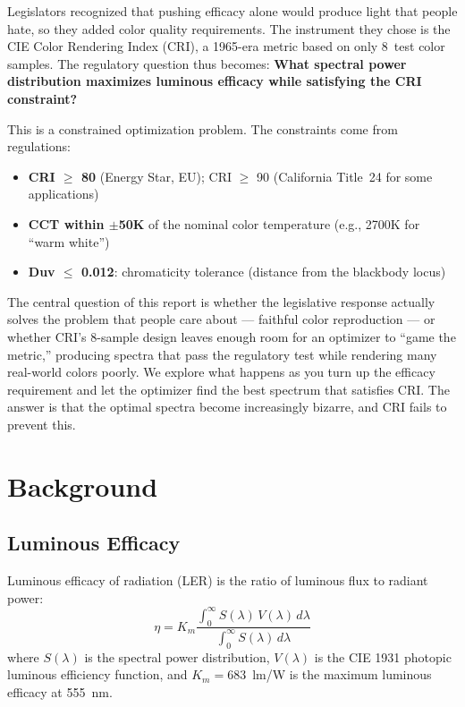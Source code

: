 \documentclass[11pt]{article}
\begin{document}
Legislators recognized that pushing efficacy alone would produce light that
people hate, so they added color quality requirements.  The instrument they
chose is the CIE Color Rendering Index (CRI), a 1965-era metric based on
only 8~test color samples.  The regulatory question thus becomes:
\textbf{What spectral power distribution maximizes luminous efficacy while
satisfying the CRI constraint?}

This is a constrained optimization problem.  The constraints come from
regulations:
\begin{itemize}
\item \textbf{CRI $\geq$ 80} (Energy Star, EU); CRI $\geq$ 90 (California Title~24 for some applications)
\item \textbf{CCT within $\pm$50K} of the nominal color temperature (e.g., 2700K for ``warm white'')
\item \textbf{Duv $\leq$ 0.012}: chromaticity tolerance (distance from the blackbody locus)
\end{itemize}

The central question of this report is whether the legislative response
actually solves the problem that people care about --- faithful color
reproduction --- or whether CRI's 8-sample design leaves enough room for
an optimizer to ``game the metric,'' producing spectra that pass the
regulatory test while rendering many real-world colors poorly.  We explore
what happens as you turn up the efficacy requirement and let the optimizer
find the best spectrum that satisfies CRI.  The answer is that the optimal
spectra become increasingly bizarre, and CRI fails to prevent this.

\section{Background}

\subsection{Luminous Efficacy}

Luminous efficacy of radiation (LER) is the ratio of luminous flux to radiant
power:
\begin{equation}
\eta = K_m \frac{\int_0^\infty S(\lambda)\, V(\lambda)\, d\lambda}
                {\int_0^\infty S(\lambda)\, d\lambda}
\end{equation}
where $S(\lambda)$ is the spectral power distribution, $V(\lambda)$ is the
CIE 1931 photopic luminous efficiency function, and $K_m = 683$~lm/W is the
maximum luminous efficacy at 555~nm.
\end{document}
